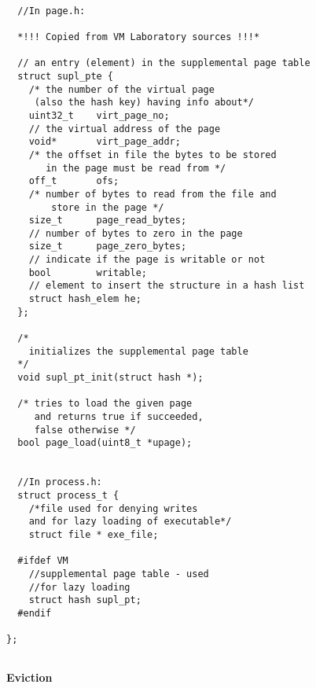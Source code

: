 \begin{lstlisting}
 
  //In page.h:
  
  *!!! Copied from VM Laboratory sources !!!*

  // an entry (element) in the supplemental page table
  struct supl_pte {					
	/* the number of the virtual page 
	 (also the hash key) having info about*/
	uint32_t	virt_page_no; 			
	// the virtual address of the page
	void*		virt_page_addr;			
	/* the offset in file the bytes to be stored 
	   in the page must be read from */
	off_t 		ofs;				
	/* number of bytes to read from the file and
	    store in the page */
	size_t 		page_read_bytes;		
	// number of bytes to zero in the page
	size_t 		page_zero_bytes; 		
	// indicate if the page is writable or not
	bool		writable;		
	// element to insert the structure in a hash list
	struct hash_elem he;				
  };

  /*
    initializes the supplemental page table
  */
  void supl_pt_init(struct hash *);
  
  /* tries to load the given page
     and returns true if succeeded,
     false otherwise */
  bool page_load(uint8_t *upage);


  //In process.h:
  struct process_t {
    /*file used for denying writes 
    and for lazy loading of executable*/
    struct file * exe_file;

  #ifdef VM
    //supplemental page table - used
    //for lazy loading
    struct hash supl_pt;				
  #endif

};
  
\end{lstlisting}

\textbf{Eviction}

